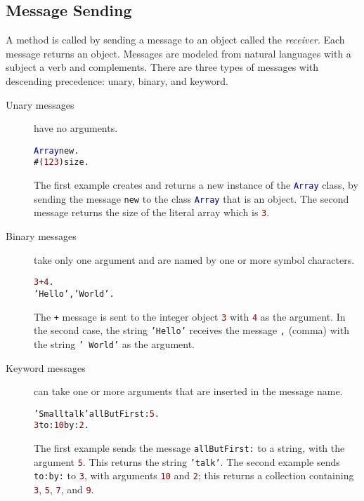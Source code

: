 \subsection{Message Sending}

A method is called by sending a message to an object called the \emph{receiver}.
Each message returns an object.
Messages are modeled from natural languages with a subject a verb and complements. There are three types of messages with descending precedence: unary, binary, and keyword.

\begin{description}
\item[Unary messages] have no arguments.

\begin{alltt}
\textcolor{darkBlue}{Array} new.
#(\textcolor{darkRed}{1 2 3}) size.
\end{alltt}

The first example creates and returns a new instance of the \textcolor{darkBlue}{\texttt{Array}} class, by sending the message \texttt{new} to the class
\textcolor{darkBlue}{\texttt{Array}} that is an object.
The second message returns the size of the literal array which is \textcolor{darkRed}{\texttt{3}}.

\item[Binary messages] take only one argument and are named by one or more symbol characters.

\begin{alltt}
\textcolor{darkRed}{3} + \textcolor{darkRed}{4}.
\textcolor{string}{'Hello'}, \textcolor{string}{' World'}.
\end{alltt}

The \texttt{+} message is sent to the integer object \textcolor{darkRed}{\texttt{3}} with \textcolor{darkRed}{\texttt{4}} as the argument.
In the second case, the string \textcolor{string}{\texttt{'Hello'}} receives the message \texttt{,} (comma) with the string \textcolor{string}{\texttt{'~World'}} as the argument.

\item[Keyword messages] can take one or more arguments that are inserted in the message name.

\begin{alltt}
\textcolor{string}{'Smalltalk'} allButFirst: \textcolor{darkRed}{5}.
\textcolor{darkRed}{3} to: \textcolor{darkRed}{10} by: \textcolor{darkRed}{2}.
\end{alltt}

The first example sends the message \texttt{allButFirst:} to a string, with the argument \textcolor{darkRed}{\texttt{5}}.
This returns the string \textcolor{string}{\texttt{'talk'}}.
The second example sends \texttt{to:by:} to \textcolor{darkRed}{\texttt{3}}, with arguments \textcolor{darkRed}{\texttt{10}} and \textcolor{darkRed}{\texttt{2}}; this returns a collection containing \textcolor{darkRed}{\texttt{3}}, \textcolor{darkRed}{\texttt{5}}, \textcolor{darkRed}{\texttt{7}}, and \textcolor{darkRed}{\texttt{9}}.

\end{description}


